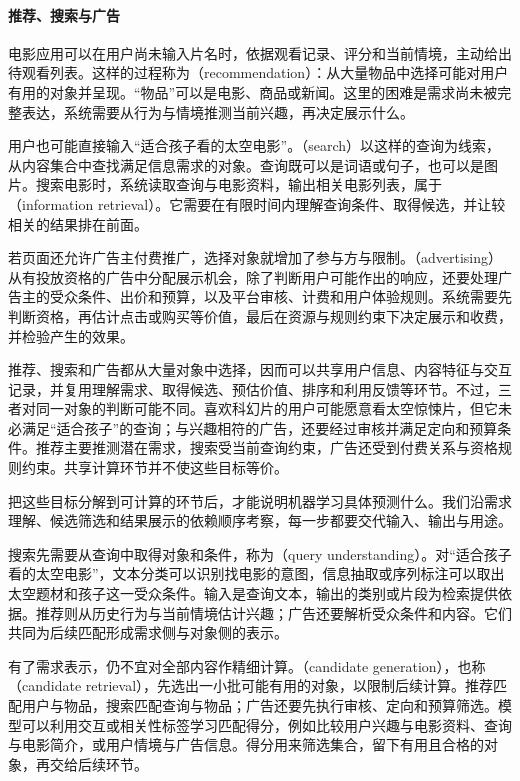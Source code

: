 \paragraph{推荐、搜索与广告}
电影应用可以在用户尚未输入片名时，依据观看记录、评分和当前情境，主动给出待观看列表。这样的过程称为（recommendation）：从大量物品中选择可能对用户有用的对象并呈现。“物品”可以是电影、商品或新闻。这里的困难是需求尚未被完整表达，系统需要从行为与情境推测当前兴趣，再决定展示什么。

用户也可能直接输入“适合孩子看的太空电影”。（search）以这样的查询为线索，从内容集合中查找满足信息需求的对象。查询既可以是词语或句子，也可以是图片。搜索电影时，系统读取查询与电影资料，输出相关电影列表，属于（information retrieval）。它需要在有限时间内理解查询条件、取得候选，并让较相关的结果排在前面。

若页面还允许广告主付费推广，选择对象就增加了参与方与限制。（advertising）从有投放资格的广告中分配展示机会，除了判断用户可能作出的响应，还要处理广告主的受众条件、出价和预算，以及平台审核、计费和用户体验规则。系统需要先判断资格，再估计点击或购买等价值，最后在资源与规则约束下决定展示和收费，并检验产生的效果。

推荐、搜索和广告都从大量对象中选择，因而可以共享用户信息、内容特征与交互记录，并复用理解需求、取得候选、预估价值、排序和利用反馈等环节。不过，三者对同一对象的判断可能不同。喜欢科幻片的用户可能愿意看太空惊悚片，但它未必满足“适合孩子”的查询；与兴趣相符的广告，还要经过审核并满足定向和预算条件。推荐主要推测潜在需求，搜索受当前查询约束，广告还受到付费关系与资格规则约束。共享计算环节并不使这些目标等价。

把这些目标分解到可计算的环节后，才能说明机器学习具体预测什么。我们沿需求理解、候选筛选和结果展示的依赖顺序考察，每一步都要交代输入、输出与用途。

搜索先需要从查询中取得对象和条件，称为（query understanding）。对“适合孩子看的太空电影”，文本分类可以识别找电影的意图，信息抽取或序列标注可以取出太空题材和孩子这一受众条件。输入是查询文本，输出的类别或片段为检索提供依据。推荐则从历史行为与当前情境估计兴趣；广告还要解析受众条件和内容。它们共同为后续匹配形成需求侧与对象侧的表示。

有了需求表示，仍不宜对全部内容作精细计算。（candidate generation），也称（candidate retrieval），先选出一小批可能有用的对象，以限制后续计算。推荐匹配用户与物品，搜索匹配查询与物品；广告还要先执行审核、定向和预算筛选。模型可以利用交互或相关性标签学习匹配得分，例如比较用户兴趣与电影资料、查询与电影简介，或用户情境与广告信息。得分用来筛选集合，留下有用且合格的对象，再交给后续环节。

